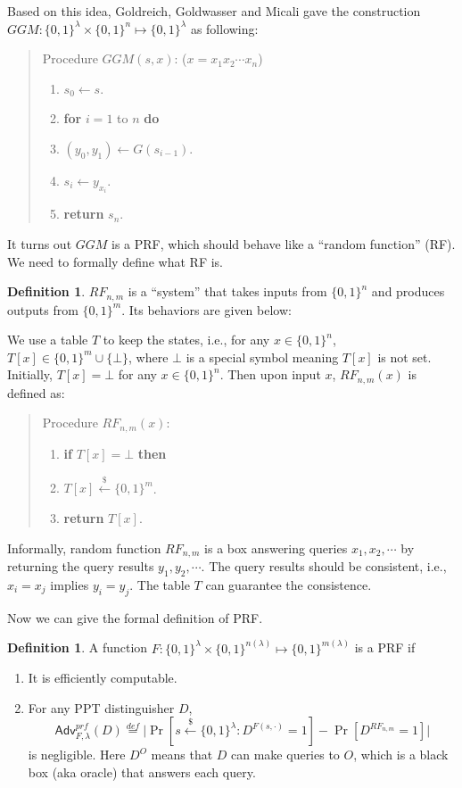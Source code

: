 \documentclass[12pt]{article}
\newcommand{\eqdef}{\stackrel{def}{=}}
\newcommand{\bits}{\{0,1\}}
\newcommand{\getsr}{\stackrel{\$}{\gets}}
\newcommand{\Adv}{\mathsf{Adv}}
\newcommand{\tab}{\hspace{0.3in}}
\theoremstyle{definition}
\newtheorem{definition}[theorem]{Definition}
\begin{document}
Based on this idea, Goldreich, Goldwasser and Micali \cite{GGM86} gave the construction $GGM : \bits^\lambda \times \bits^n \mapsto \bits^\lambda$ as following:
\begin{quote}
Procedure $GGM(s,x)$: ($x=x_1x_2\cdots x_n$)
\begin{enumerate}
\item $s_0 \gets s$.
\item {\bf for} $i=1$ to $n$ {\bf do}
\item \tab $(y_0, y_1) \gets G(s_{i-1})$.
\item \tab $s_i \gets y_{x_i}$.
\item {\bf return} $s_n$.
\end{enumerate}
\end{quote}
It turns out $GGM$ is a PRF, which should behave like a ``random function'' (RF). We need to formally define what RF is.
\begin{definition}
$RF_{n,m}$ is a ``system'' that takes inputs from $\bits^n$ and produces outputs from $\bits^m$. Its behaviors are given below:

We use a table $T$ to keep the states, i.e., for any $x\in\bits^n$, $T[x] \in \bits^m \cup \{\bot\}$, where $\bot$ is a special symbol meaning $T[x]$ is not set. Initially, $T[x] = \bot$ for any $x\in\bits^n$. Then upon input $x$, $RF_{n,m}(x)$ is defined as:
\begin{quote}
Procedure $RF_{n,m}(x)$:
\begin{enumerate}
\item {\bf if} $T[x] = \bot$ {\bf then}
\item \tab $T[x] \getsr \bits^m$.
\item {\bf return} $T[x]$.
\end{enumerate}
\end{quote}
\end{definition}
Informally, random function $RF_{n,m}$ is a box answering queries $x_1,x_2,\cdots$ by returning the query results $y_1,y_2,\cdots$. The query results should be consistent, i.e., $x_i = x_j$ implies $y_i = y_j$. The table $T$ can guarantee the consistence.

Now we can give the formal definition of PRF.
\begin{definition}
A function $F : \bits^\lambda \times \bits^{n(\lambda)} \mapsto \bits^{m(\lambda)}$ is a PRF if
\begin{enumerate}
\item It is efficiently computable.
\item For any PPT distinguisher $D$,
$$\Adv_{F,\lambda}^{prf}(D) \eqdef \bigg| \Pr[s \getsr \bits^\lambda: D^{F(s,\cdot)}=1] - \Pr[D^{RF_{n,m}}=1] \bigg|$$
is negligible. Here $D^{O}$ means that $D$ can make queries to $O$, which is a black box (aka oracle) that answers each query. 
\end{enumerate}
\end{definition}
\end{document}

